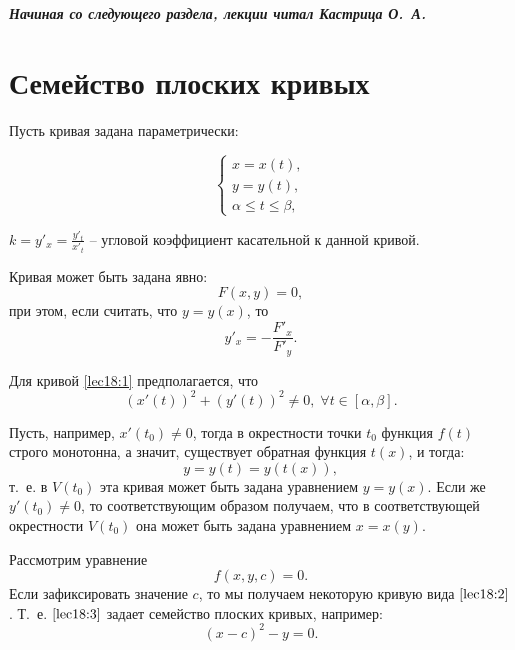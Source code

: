 \documentclass[../../main.tex]{subfiles}
\begin{document}
\hrulefill

\bigskip

\begin{center}
{\it \textbf{Начиная со следующего раздела, лекции читал Кастрица О.~А.}} 
\end{center}

\hrulefill

\bigskip

\section{Семейство плоских кривых}

Пусть кривая задана параметрически:

 \begin{equation} \begin{cases}
 \label{lec18:1}
x=x(t),\\
y=y(t), \\
\alpha \le t \le \beta,
\end{cases}
\end{equation}

$k = y'_x = \frac{y'_t}{x'_t}$ \--- угловой коэффициент 
касательной к данной кривой.

Кривая может быть задана явно:
\begin{equation}\label{lec18:2} F\left( x,y \right)  = 0, \end{equation}
при этом, если считать, что $y=y(x)$, то
\[ y'_x = - \frac{F'_x}{F'_y}.\]

Для кривой \eqref{lec18:1} предполагается, что
\[ \left( x' \left( t \right) \right)^2 + \left( y' \left( t \right) \right)^2 
\ne 0, \;  \forall t \in \left[ \alpha, \beta \right]. \]

Пусть, например, $x'\left( t_0 \right) \ne 0 $, тогда в окрестности точки 
$t_0$ 
функция $f\left( t \right) $ строго монотонна, а значит, существует обратная 
функция $t\left( x \right) $, и тогда:
\[ y = y \left( t \right) = y \left( t\left( x \right) \right), \]
т.~е. в $V \left( t_0 \right) $ эта кривая может быть задана уравнением
$y=y(x)$.
Если же $y'(t_0) \ne 0$, то соответствующим образом получаем, что в 
соответствующей окрестности $V \left( 
t_0 \right) $ она может быть задана уравнением $x=x\left( y \right) $.

Рассмотрим уравнение
\begin{equation} \label{lec18:3} f \left( x,y,c \right) = 0.  \end{equation}
Если зафиксировать значение $c$, то мы получаем некоторую кривую вида 
$\eqref{lec18:2}$. Т.~е. $\eqref{lec18:3}$ задает семейство плоских кривых, 
например:
\[ \left( x-c \right)^2 - y = 0. \]
\end{document}
